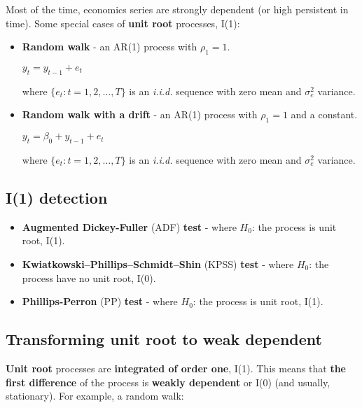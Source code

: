 \documentclass[10pt, a4paper, landscape]{extarticle}
\begin{document}
\begin{multicols}{3}
Most of the time, economics series are strongly dependent (or high persistent in time). Some special cases of \textbf{unit root} processes, I(1):

\begin{itemize}[leftmargin=*]
		\item \textbf{Random walk} - an AR(1) process with $\rho_1 = 1$.
	\begin{center}
		$y_t = y_{t - 1} + e_t$
	\end{center}
	where $\lbrace e_t : t = 1, 2, \ldots, T \rbrace$ is an \textsl{i.i.d.} sequence with zero mean and $\sigma^2_e$ variance.
	
	\item \textbf{Random walk with a drift} - an AR(1) process with $\rho_1 = 1$ and a constant.
	\begin{center}
		$y_t = \beta_0 + y_{t - 1} + e_t$
	\end{center}
	where $\lbrace e_t : t = 1, 2, \ldots, T \rbrace$ is an \textsl{i.i.d.} sequence with zero mean and $\sigma^2_e$ variance.
\end{itemize}

\subsection*{I(1) detection}

\begin{itemize}[leftmargin=*]
	\item \textbf{Augmented Dickey-Fuller} (ADF) \textbf{test} - where $H_0$: the process is unit root, I(1).
	\item \textbf{Kwiatkowski–Phillips–Schmidt–Shin} (KPSS) \textbf{test} - where $H_0$: the process have no unit root, I(0).
	\item \textbf{Phillips-Perron} (PP) \textbf{test} - where $H_0$: the process is unit root, I(1).
\end{itemize}

\subsection*{Transforming unit root to weak dependent}

\textbf{Unit root} processes are \textbf{integrated of order one}, I(1). This means that \textbf{the first difference} of the process is \textbf{weakly dependent} or I(0) (and usually, stationary). For example, a random walk:

\begin{multicols}{2}


\end{multicols}
\end{multicols}
\end{document}
